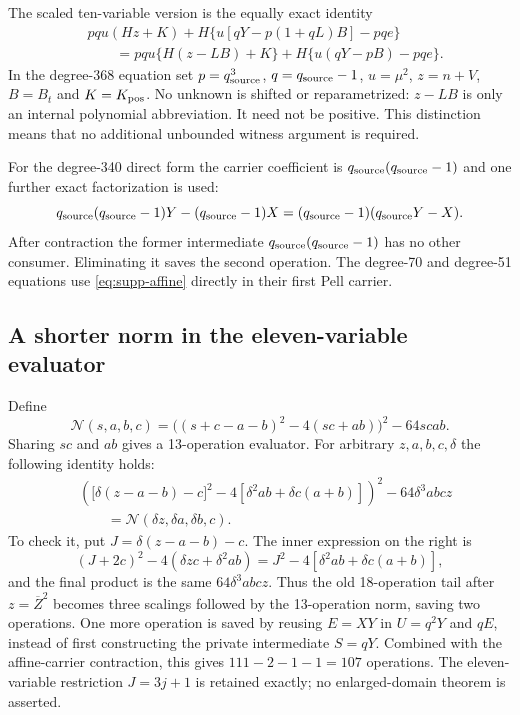 The scaled ten-variable version is the equally exact identity
\begin{align*}
 &pqu(Hz+K)+H\{u[qY-p(1+qL)B]-pqe\}\\
 &\qquad=pqu\{H(z-LB)+K\}+H\{u(qY-pB)-pqe\}.
\end{align*}
In the degree-368 equation set $p=q_{\rm source}^3$,
$q=q_{\rm source}-1$, $u=\mu^2$, $z=n+V$, $B=B_t$ and $K=K_{\rm pos}$.
No unknown is shifted or reparametrized: $z-LB$ is only an internal
polynomial abbreviation. It need not be positive. This distinction means
that no additional unbounded witness argument is required.

For the degree-340 direct form the carrier coefficient is
$q_{\rm source}(q_{\rm source}-1)$ and one further exact factorization is
used:
\[
 q_{\rm source}(q_{\rm source}-1)Y-(q_{\rm source}-1)X
  =(q_{\rm source}-1)(q_{\rm source}Y-X).
\]
After contraction the former intermediate
$q_{\rm source}(q_{\rm source}-1)$ has no other consumer. Eliminating it
saves the second operation. The degree-70 and degree-51 equations use
\eqref{eq:supp-affine} directly in their first Pell carrier.

\subsection{A shorter norm in the eleven-variable evaluator}
Define
\[
 \mathcal N(s,a,b,c)
 =\bigl((s+c-a-b)^2-4(sc+ab)\bigr)^2-64scab.
\]
Sharing $sc$ and $ab$ gives a 13-operation evaluator. For arbitrary
$z,a,b,c,\delta$ the following identity holds:
\begin{align*}
 &\left(\bigl[\delta(z-a-b)-c\bigr]^2
        -4[\delta^2ab+\delta c(a+b)]\right)^2
       -64\delta^3abc z\\
 &\qquad=\mathcal N(\delta z,\delta a,\delta b,c).
 \label{eq:supp-norm}
\end{align*}
To check it, put $J=\delta(z-a-b)-c$. The inner expression on the right is
\[
 (J+2c)^2-4(\delta zc+\delta^2ab)
 =J^2-4[\delta^2ab+\delta c(a+b)],
\]
and the final product is the same $64\delta^3abc z$.
Thus the old 18-operation tail after $z=\overline Z^2$ becomes three
scalings followed by the 13-operation norm, saving two operations.
One more operation is saved by reusing $E=XY$ in
$U=q^2Y$ and $qE$, instead of first constructing the private intermediate
$S=qY$. Combined with the affine-carrier contraction, this gives
$111-2-1-1=107$ operations. The eleven-variable restriction
$J=3j+1$ is retained exactly; no enlarged-domain theorem is asserted.

